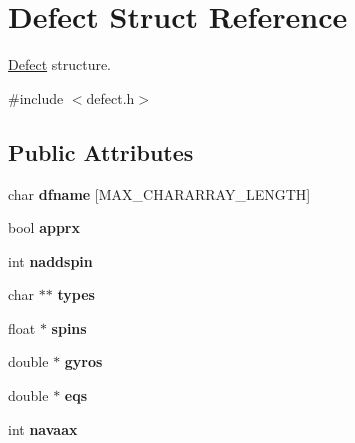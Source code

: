 \hypertarget{structDefect}{\section{Defect Struct Reference}
\label{structDefect}
}


\hyperlink{structDefect}{Defect} structure.  




{\ttfamily \#include $<$defect.\-h$>$}

\subsection*{Public Attributes}
\begin{DoxyCompactItemize}
\item 
\hypertarget{structDefect_a146e7e006db29d11dc4ebfffe07f7ba2}{char {\bfseries dfname} \mbox{[}M\-A\-X\-\_\-\-C\-H\-A\-R\-A\-R\-R\-A\-Y\-\_\-\-L\-E\-N\-G\-T\-H\mbox{]}}\label{structDefect_a146e7e006db29d11dc4ebfffe07f7ba2}

\item 
\hypertarget{structDefect_a9a7a7ae97aef4114f4801163ae39147c}{bool {\bfseries apprx}}\label{structDefect_a9a7a7ae97aef4114f4801163ae39147c}

\item 
\hypertarget{structDefect_a7864b15a37c1fb117e560035b63b9c3d}{int {\bfseries naddspin}}\label{structDefect_a7864b15a37c1fb117e560035b63b9c3d}

\item 
\hypertarget{structDefect_aaa82ab61e61e3d31a1761e65236ead88}{char $\ast$$\ast$ {\bfseries types}}\label{structDefect_aaa82ab61e61e3d31a1761e65236ead88}

\item 
\hypertarget{structDefect_a4b7e765b16ce28c69342dd09c35be858}{float $\ast$ {\bfseries spins}}\label{structDefect_a4b7e765b16ce28c69342dd09c35be858}

\item 
\hypertarget{structDefect_adab228a8a6560c6b298ea29f18bcfd95}{double $\ast$ {\bfseries gyros}}\label{structDefect_adab228a8a6560c6b298ea29f18bcfd95}

\item 
\hypertarget{structDefect_a888a4c262ee2351e069ff2188e3d470f}{double $\ast$ {\bfseries eqs}}\label{structDefect_a888a4c262ee2351e069ff2188e3d470f}

\item 
\hypertarget{structDefect_ab816f5aebb89efafbe0ac4f632c17fb1}{int {\bfseries navaax}}\label{structDefect_ab816f5aebb89efafbe0ac4f632c17fb1}


\end{DoxyCompactItemize}
